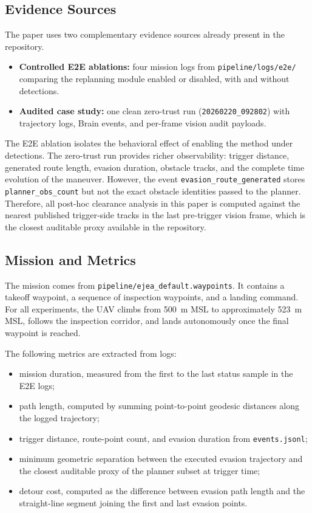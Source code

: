 \documentclass[a4paper,11pt]{article}
\begin{document}
\subsection{Evidence Sources}

The paper uses two complementary evidence sources already present in the repository.
\begin{itemize}[leftmargin=1.3em]
    \item \textbf{Controlled E2E ablations:} four mission logs from \texttt{pipeline/logs/e2e/} comparing the replanning module enabled or disabled, with and without detections.
    \item \textbf{Audited case study:} one clean zero-trust run (\texttt{20260220\_092802}) with trajectory logs, Brain events, and per-frame vision audit payloads.
\end{itemize}

The E2E ablation isolates the behavioral effect of enabling the method under detections. The zero-trust run provides richer observability: trigger distance, generated route length, evasion duration, obstacle tracks, and the complete time evolution of the maneuver. However, the event \texttt{evasion\_route\_generated} stores \texttt{planner\_obs\_count} but not the exact obstacle identities passed to the planner. Therefore, all post-hoc clearance analysis in this paper is computed against the nearest published trigger-side tracks in the last pre-trigger vision frame, which is the closest auditable proxy available in the repository.

\subsection{Mission and Metrics}

The mission comes from \texttt{pipeline/ejea\_default.waypoints}. It contains a takeoff waypoint, a sequence of inspection waypoints, and a landing command. For all experiments, the UAV climbs from \SI{500}{\meter} MSL to approximately \SI{523}{\meter} MSL, follows the inspection corridor, and lands autonomously once the final waypoint is reached.

The following metrics are extracted from logs:
\begin{itemize}[leftmargin=1.3em]
    \item mission duration, measured from the first to the last status sample in the E2E logs;
    \item path length, computed by summing point-to-point geodesic distances along the logged trajectory;
    \item trigger distance, route-point count, and evasion duration from \texttt{events.jsonl};
    \item minimum geometric separation between the executed evasion trajectory and the closest auditable proxy of the planner subset at trigger time;
    \item detour cost, computed as the difference between evasion path length and the straight-line segment joining the first and last evasion points.
\end{itemize}
\end{document}
